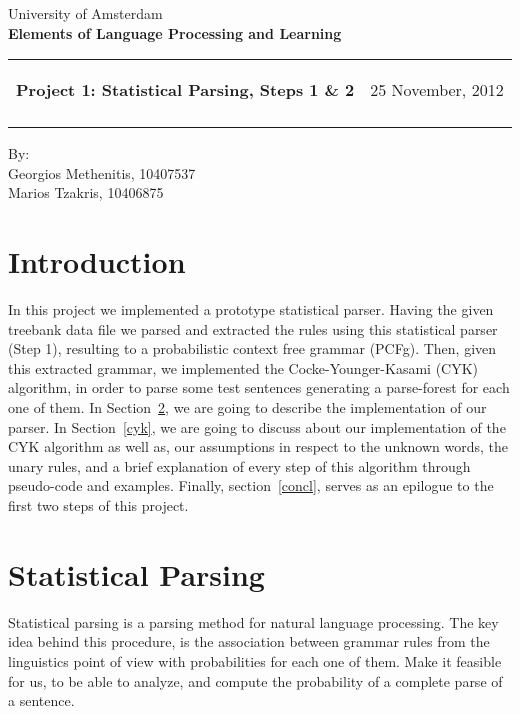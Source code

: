 \documentclass[a4paper,11pt]{article}
\makeatletter
\newcommand{\resheading}[1]{{\large \colorbox{mygrey}{\begin{minipage}{\textwidth}{\textbf{#1 \vphantom{p\^{E}}}}\end{minipage}}}}
\newcommand{\mywebheader}{
  \begin{tabular}{@{}p{5in}p{4in}}
  {\resheading{Project 1: Statistical Parsing, Steps 1 \& 2}} & {\Large 25 November, 2012}\\\vspace{0.2cm}
  \end{tabular}}
\makeatother
\begin{document}
\begin{center}
{\Large University of Amsterdam}\\ \vspace{0.1cm}
{\LARGE \textbf{Elements of Language Processing and Learning}}\\ [1em]
\end{center}
\mywebheader

\begin{center}
{\Large By:} \\ \vspace{0.2cm}
{\Large Georgios Methenitis, 10407537} \\ \vspace{0.1cm}
{\Large Marios Tzakris, 10406875}\\
\end{center}






\section{Introduction}
In this project we implemented a prototype statistical parser. Having the given treebank data file we parsed and extracted the rules using this statistical parser (Step 1), resulting to a probabilistic context free grammar (PCFg). Then, given this extracted grammar, we implemented the Cocke-Younger-Kasami (CYK) algorithm, in order to parse some test sentences generating a parse-forest for each one of them. In Section~\ref{parser}, we are going to describe the implementation of our parser. In Section~\ref{cyk}, we are going to discuss about our implementation of the CYK algorithm as well as, our assumptions in respect to the unknown words, the unary rules, and a brief explanation of every step of this algorithm through pseudo-code and examples. Finally, section~\ref{concl}, serves as an epilogue to the first two steps of this project.





\section{Statistical Parsing}
\label{parser}
Statistical parsing is a parsing method for natural language processing. The key idea behind this procedure, is the association between grammar rules from the linguistics point of view with probabilities for each one of them. Make it feasible for us, to be able to analyze, and compute the probability of a complete parse of a sentence. 
\end{document}
